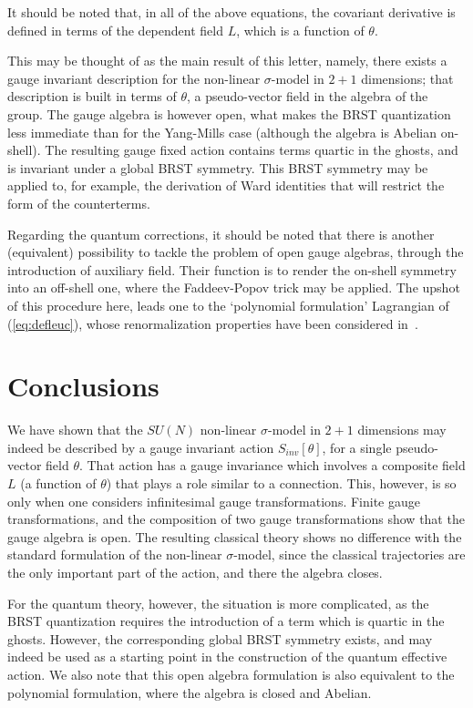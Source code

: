 \documentclass[a4paper,12pt]{article}
\begin{document}
It should be noted that, in all of the above equations, the covariant
derivative is defined in terms of the dependent field $L$, which
is a function of $\theta$.

This may be thought of as the main result of this letter, namely,
there exists a gauge invariant description  for the non-linear
$\sigma$-model in $2+1$ dimensions; that description is built in terms 
of $\theta$, a pseudo-vector field in the algebra of the group.
The gauge algebra is however open, what makes the BRST quantization
less immediate than for the Yang-Mills case (although the algebra is
Abelian on-shell). The resulting gauge fixed action contains terms
quartic in the ghosts, and is invariant under a global BRST symmetry. 
This BRST symmetry may be applied to, for example, the derivation of
Ward identities that will restrict the form of the counterterms.

Regarding the quantum corrections, it should be noted that there is
another (equivalent) possibility to tackle the problem of open gauge algebras,
through the introduction of auxiliary field. Their function is to
render the on-shell symmetry into an off-shell one, where the
Faddeev-Popov trick may be applied. The upshot of this procedure here, 
leads one to the `polynomial formulation' Lagrangian of
(\ref{eq:defleuc}), whose renormalization properties have been
considered in~\cite{fm1}.

\section{Conclusions}\label{sec:conc}
We have shown that the $SU(N)$ non-linear $\sigma$-model in $2+1$
dimensions may indeed be described by a gauge invariant action 
$S_{inv}[\theta]$,  for a single pseudo-vector field $\theta$. That
action has a gauge invariance which involves a composite field $L$
(a function of $\theta$) that plays a role similar to a connection. 
This, however, is so only when one considers infinitesimal 
gauge transformations. Finite gauge transformations, and the
composition of two gauge transformations show that the gauge algebra
is open. The resulting classical theory shows no difference with the
standard formulation of the non-linear $\sigma$-model, since the
classical trajectories are the only important part of the action, and
there the algebra closes. 

For the quantum theory, however, the situation is more complicated, as
the BRST quantization requires the introduction of a term which is
quartic in the ghosts. However, the corresponding global BRST symmetry
exists, and may indeed be used as a starting point in the construction
of the quantum effective action. We also note that this open algebra
formulation is also equivalent to the polynomial formulation, where
the algebra is closed and Abelian.
\end{document}
